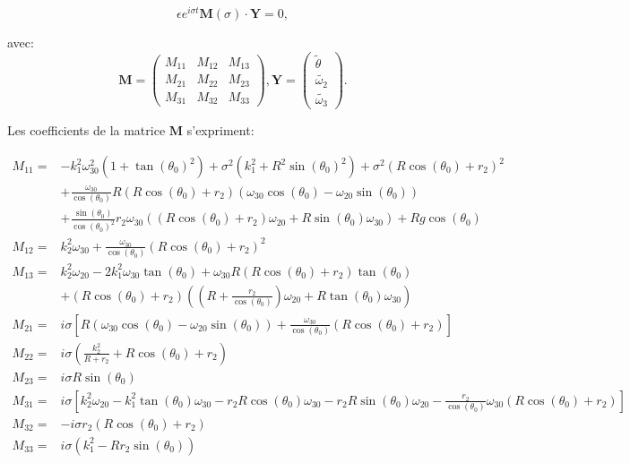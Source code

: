 \begin{equation}
    \epsilon e^{i\sigma t} \mathbf{M}(\sigma) \cdot \mathbf{Y}  = 0,
\end{equation}

avec:
$$
\mathbf{M}= \begin{pmatrix}
    M_{11}       & M_{12} & M_{13}  \\
    M_{21}       & M_{22} & M_{23}  \\
    M_{31}       & M_{32} & M_{33} 
\end{pmatrix}
,
\mathbf{Y}= \begin{pmatrix}
    \tilde{\theta}   \\
    \tilde{\omega_2} \\
    \tilde{\omega_3}     
\end{pmatrix}.
$$


Les coefficients de la matrice $\mathbf{M}$ s'expriment:

\begin{align}
    M_{11}=& -k_1^2 \omega_{30}^2(1+\tan(\theta_0)^2)+\sigma^2 (k_1^2+R^2\sin(\theta_0)^2)+ \sigma^2(R\cos(\theta_0)+r_2)^2 \nonumber \\
    &+\frac{\omega_{30}}{\cos(\theta_0)}R(R\cos(\theta_0)+r_2)(\omega_{30}\cos(\theta_0)-\omega_{20}\sin(\theta_0)) \nonumber \\
    &+ \frac{\sin(\theta_0)}{\cos(\theta_0)^2} r_2 \omega_{30}((R\cos(\theta_0)+r_2)\omega_{20}+R\sin(\theta_0)\omega_{30})+Rg\cos(\theta_0) \nonumber \\
    M_{12}=&k_2^2 \omega_{30} +\frac{\omega_{30}}{\cos(\theta_0)}(R\cos(\theta_0)+r_2)^2 \nonumber \\
    M_{13}=&k_2^2 \omega_{20}-2 k_1^2 \omega_{30} \tan(\theta_0)+\omega_{30}R(R\cos(\theta_0)+r_2)\tan(\theta_0)\nonumber \\
    &+ (R \cos(\theta_0)+r_2)((R+\frac{r_2}{\cos(\theta_0)})\omega_{20}+R\tan(\theta_0)\omega_{30}) \nonumber \\
    M_{21}=&i \sigma [R(\omega_{30}\cos(\theta_0)-\omega_{20}\sin(\theta_0))+ \frac{\omega_{30}}{\cos(\theta_0)} (R\cos(\theta_0)+r_2)] \nonumber \\
    M_{22}=& i\sigma (\frac{k_2^2}{R+r_2} + R\cos(\theta_0)+r_2) \nonumber \\
    M_{23}=&i \sigma R \sin(\theta_0) \nonumber \\
    M_{31}=& i \sigma[k_2^2\omega_{20}-k_1^2\tan(\theta_0) \omega_{30}-r_2 R\cos(\theta_0)\omega_{30}-r_2 R\sin(\theta_0)\omega_{20}-\frac{r_2}{\cos(\theta_0)}\omega_{30}(R\cos(\theta_0)+r_2)] \nonumber \\
    M_{32}=&- i \sigma r_2 (R\cos(\theta_0)+r_2) \nonumber \\
    M_{33}=&i \sigma(k_1^2-R r_2 \sin(\theta_0)) 
\label{eq:mat}
\end{align}


